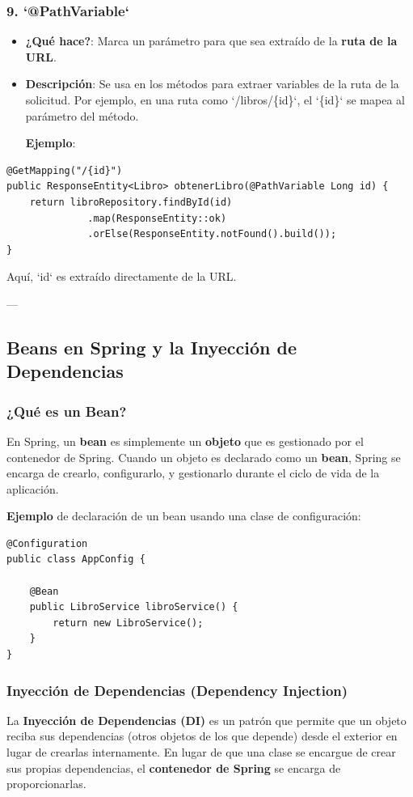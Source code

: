 \documentclass[11pt]{article}
\begin{document}
\subsubsection{9. \textbf{\textbf{`@PathVariable`}}}
\label{sec:org4474add}
\begin{itemize}
\item \textbf{\textbf{¿Qué hace?}}: Marca un parámetro para que sea extraído de la \textbf{\textbf{ruta de la URL}}.
\item \textbf{\textbf{Descripción}}: Se usa en los métodos para extraer variables de la ruta de la solicitud. Por ejemplo, en una ruta como `/libros/\{id\}`, el `\{id\}` se mapea al parámetro del método.

\textbf{\textbf{Ejemplo}}:
\end{itemize}


\begin{verbatim}
@GetMapping("/{id}")
public ResponseEntity<Libro> obtenerLibro(@PathVariable Long id) {
    return libroRepository.findById(id)
              .map(ResponseEntity::ok)
              .orElse(ResponseEntity.notFound().build());
}
\end{verbatim}

Aquí, `id` es extraído directamente de la URL.

---

\subsection{Beans en Spring y la Inyección de Dependencias}
\label{sec:orga6e2e13}
\subsubsection{¿Qué es un Bean?}
\label{sec:org158cf82}
En Spring, un \textbf{\textbf{bean}} es simplemente un \textbf{\textbf{objeto}} que es gestionado por el contenedor de Spring. Cuando un objeto es declarado como un \textbf{\textbf{bean}}, Spring se encarga de crearlo, configurarlo, y gestionarlo durante el ciclo de vida de la aplicación.

\textbf{\textbf{Ejemplo}} de declaración de un bean usando una clase de configuración:
\begin{verbatim}
@Configuration
public class AppConfig {

    @Bean
    public LibroService libroService() {
        return new LibroService();
    }
}
\end{verbatim}

\subsubsection{Inyección de Dependencias (Dependency Injection)}
\label{sec:org75aee1c}
La \textbf{\textbf{Inyección de Dependencias (DI)}} es un patrón que permite que un objeto reciba sus dependencias (otros objetos de los que depende) desde el exterior en lugar de crearlas internamente. En lugar de que una clase se encargue de crear sus propias dependencias, el \textbf{\textbf{contenedor de Spring}} se encarga de proporcionarlas.
\end{document}

